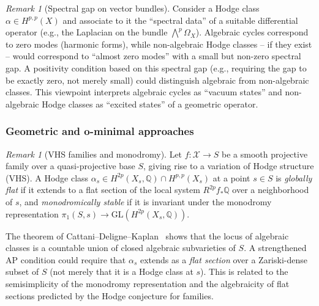 \documentclass[aps,prd,twocolumn,superscriptaddress,nofootinbib]{revtex4-2}
\theoremstyle{definition}
\theoremstyle{remark}
\newtheorem{remark}[theorem]{Remark}
\begin{document}
\begin{remark}[Spectral gap on vector bundles]
\label{rem:spectral-gap}
Consider a Hodge class $\alpha \in H^{p,p}(X)$ and associate to it the ``spectral data'' of a suitable differential operator (e.g., the Laplacian on the bundle $\bigwedge^p \Omega_X$). Algebraic cycles correspond to zero modes (harmonic forms), while non-algebraic Hodge classes -- if they exist -- would correspond to ``almost zero modes'' with a small but non-zero spectral gap. A positivity condition based on this spectral gap (e.g., requiring the gap to be exactly zero, not merely small) could distinguish algebraic from non-algebraic classes. This viewpoint interprets algebraic cycles as ``vacuum states'' and non-algebraic Hodge classes as ``excited states'' of a geometric operator.
\end{remark}

\subsubsection{Geometric and o-minimal approaches}

\begin{remark}[VHS families and monodromy]
\label{rem:vhs-monodromy}
Let $f: \mathcal{X} \to S$ be a smooth projective family over a quasi-projective base $S$, giving rise to a variation of Hodge structure (VHS). A Hodge class $\alpha_s \in H^{2p}(X_s, \mathbb{Q}) \cap H^{p,p}(X_s)$ at a point $s \in S$ is \textit{globally flat} if it extends to a flat section of the local system $R^{2p}f_*\mathbb{Q}$ over a neighborhood of $s$, and \textit{monodromically stable} if it is invariant under the monodromy representation $\pi_1(S, s) \to \mathrm{GL}(H^{2p}(X_s, \mathbb{Q}))$.

The theorem of Cattani--Deligne--Kaplan~\cite{CattaniDeligneKaplan1995} shows that the locus of algebraic classes is a countable union of closed algebraic subvarieties of $S$. A strengthened AP condition could require that $\alpha_s$ extends as a \textit{flat section} over a Zariski-dense subset of $S$ (not merely that it is a Hodge class at $s$). This is related to the semisimplicity of the monodromy representation and the algebraicity of flat sections predicted by the Hodge conjecture for families.
\end{remark}
\end{document}
